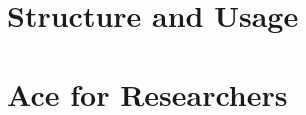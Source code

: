 \documentclass{sig-alternate}
\begin{document}
%

\section{Structure and Usage}
\section{Ace for Researchers}
\end{document}
